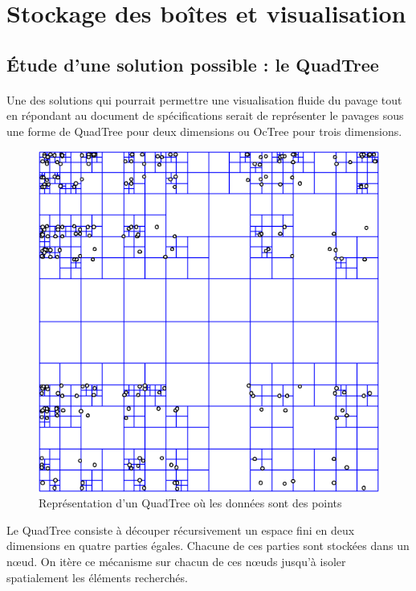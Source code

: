 \section{Stockage des boîtes et visualisation}

\subsection{\'Etude d'une solution possible : le QuadTree}
\paragraph{}Une des solutions qui pourrait permettre une visualisation fluide du pavage tout en répondant au document de spécifications serait de représenter le pavages sous une forme de QuadTree pour deux dimensions ou OcTree pour trois dimensions.
\begin{figure}[htbp]
\centering
\includegraphics[scale=0.50]{img/quadtree}
\caption{Représentation d'un QuadTree où les données sont des points}

\end{figure}

Le QuadTree consiste à découper récursivement un espace fini en deux dimensions en quatre parties égales. Chacune de ces parties sont stockées dans un nœud. On itère ce mécanisme sur chacun de ces nœuds jusqu'à isoler spatialement les éléments recherchés.

